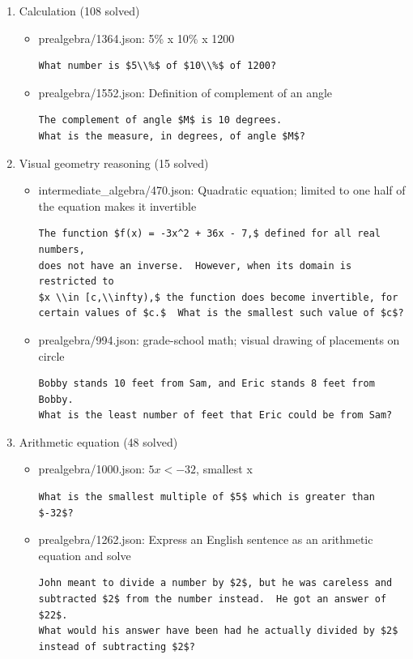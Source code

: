 \documentclass[11pt,a4paper]{article}
\begin{document}
\begin{enumerate}
  \item Calculation (108 solved)
    \begin{itemize}
      \item prealgebra/1364.json: 5\% x 10\% x 1200
\begin{verbatim}
What number is $5\\%$ of $10\\%$ of 1200?
\end{verbatim}
      \item prealgebra/1552.json: Definition of complement of an angle
\begin{verbatim}
The complement of angle $M$ is 10 degrees.
What is the measure, in degrees, of angle $M$?
\end{verbatim}
    \end{itemize}

  \item Visual geometry reasoning (15 solved)
    \begin{itemize}
      \item intermediate\_algebra/470.json: Quadratic equation; limited to one half of the equation makes it invertible
\begin{verbatim}
The function $f(x) = -3x^2 + 36x - 7,$ defined for all real numbers,
does not have an inverse.  However, when its domain is restricted to
$x \\in [c,\\infty),$ the function does become invertible, for
certain values of $c.$  What is the smallest such value of $c$?
\end{verbatim}
      \item prealgebra/994.json: grade-school math; visual drawing of placements on circle
\begin{verbatim}
Bobby stands 10 feet from Sam, and Eric stands 8 feet from Bobby.
What is the least number of feet that Eric could be from Sam?
\end{verbatim}
    \end{itemize}

  \item Arithmetic equation (48 solved)
    \begin{itemize}
      \item prealgebra/1000.json: $5x < -32$, smallest x
\begin{verbatim}
What is the smallest multiple of $5$ which is greater than $-32$?
\end{verbatim}
      \item prealgebra/1262.json: Express an English sentence as an arithmetic equation and solve
\begin{verbatim}
John meant to divide a number by $2$, but he was careless and
subtracted $2$ from the number instead.  He got an answer of $22$.
What would his answer have been had he actually divided by $2$
instead of subtracting $2$?
\end{verbatim}
    \end{itemize}


\end{enumerate}
\end{document}
